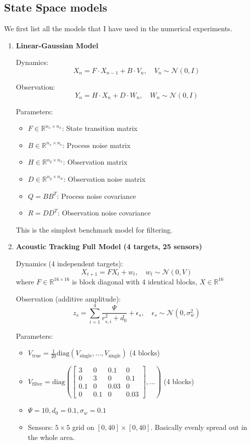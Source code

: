 \documentclass{article}
\begin{document}
\subsection{State Space models}
We first list all the models that I have used in the numerical experiments.
\begin{enumerate}

\item \textbf{Linear-Gaussian Model}

Dynamics:
\[ X_n = F \cdot X_{n-1} + B \cdot V_n, \quad V_n \sim \mathcal{N}(0, I) \]

Observation:
\[ Y_n = H \cdot X_n + D \cdot W_n, \quad W_n \sim \mathcal{N}(0, I) \]

Parameters:
\begin{itemize}
\item $F \in \mathbb{R}^{n_x \times n_x}$: State transition matrix
\item $B \in \mathbb{R}^{n_x \times n_v}$: Process noise matrix
\item $H \in \mathbb{R}^{n_y \times n_x}$: Observation matrix
\item $D \in \mathbb{R}^{n_y \times n_w}$: Observation noise matrix
\item $Q = BB^T$: Process noise covariance
\item $R = DD^T$: Observation noise covariance
\end{itemize}
This is the simplest benchmark model for filtering. 


\item \textbf{Acoustic Tracking Full Model (4 targets, 25 sensors)}

Dynamics (4 independent targets):
\[ X_{t+1} = F X_t + w_t, \quad w_t \sim \mathcal{N}(0, V) \]
where $F \in \mathbb{R}^{16 \times 16}$ is block diagonal with 4 identical blocks, $X \in \mathbb{R}^{16}$

Observation (additive amplitude):
\[ z_s = \sum_{i=1}^{4} \frac{\Psi}{r_{s,i}^2 + d_0} + \epsilon_s, \quad \epsilon_s \sim \mathcal{N}(0, \sigma_w^2) \]

Parameters:
\begin{itemize}
\item $V_{\text{true}} = \frac{1}{20} \text{diag}(V_{\text{single}}, \ldots, V_{\text{single}})$ (4 blocks)
\item $V_{\text{filter}} = \text{diag}(\begin{bmatrix} 3 & 0 & 0.1 & 0 \\ 0 & 3 & 0 & 0.1 \\ 0.1 & 0 & 0.03 & 0 \\ 0 & 0.1 & 0 & 0.03 \end{bmatrix}, \ldots)$ (4 blocks)
\item $\Psi = 10, d_0 = 0.1, \sigma_w = 0.1$
\item Sensors: $5 \times 5$ grid on $[0, 40] \times [0, 40]$. Basically evenly spread out in the whole area. 
\end{itemize}





\end{enumerate}
\end{document}
